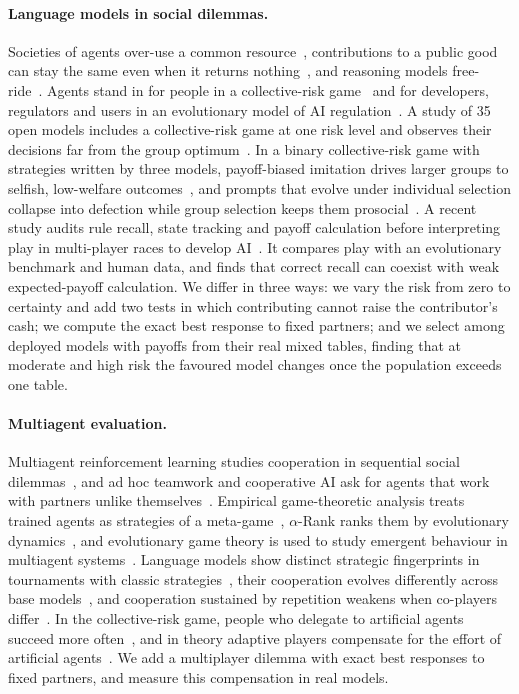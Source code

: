 \documentclass[sigconf,anonymous]{aamas}
\begin{document}
\paragraph{Language models in social dilemmas.}
Societies of agents over-use a common resource~\cite{piatti2024cooperate}, contributions to a public good can stay the same even when it returns nothing~\cite{huang2025competing}, and reasoning models free-ride~\cite{guzmanpiedrahita2025corrupted}. Agents stand in for people in a collective-risk game~\cite{slumbers2025using} and for developers, regulators and users in an evolutionary model of AI regulation~\cite{buscemi2025llms}. A study of 35 open models includes a collective-risk game at one risk level and observes their decisions far from the group optimum~\cite{kumar2026cooperative}. In a binary collective-risk game with strategies written by three models, payoff-biased imitation drives larger groups to selfish, low-welfare outcomes~\cite{willis2026evaluating}, and prompts that evolve under individual selection collapse into defection while group selection keeps them prosocial~\cite{celiktemel2026group}. A recent study audits rule recall, state tracking and payoff calculation before interpreting play in multi-player races to develop AI~\cite{pham2026humans}. It compares play with an evolutionary benchmark and human data, and finds that correct recall can coexist with weak expected-payoff calculation. We differ in three ways: we vary the risk from zero to certainty and add two tests in which contributing  cannot raise the  contributor's cash; we compute the exact best response to fixed partners; and we select among deployed models with payoffs from their real mixed tables, finding that at moderate and high risk the favoured model changes once the population exceeds one table.

\paragraph{Multiagent evaluation.}
Multiagent reinforcement learning studies cooperation in sequential social dilemmas~\cite{leibo2017multi,hughes2018inequity}, and ad hoc teamwork and cooperative AI ask for agents that work with partners unlike themselves~\cite{stone2010ad,dafoe2020open,leibo2021scalable}. Empirical game-theoretic analysis treats trained agents as strategies of a meta-game~\cite{wellman2006methods,tuyls2018generalised}, $\alpha$-Rank ranks them by evolutionary dynamics~\cite{omidshafiei2019alpha}, and evolutionary game theory is used to study emergent behaviour in multiagent systems~\cite{han2022emergent}. Language models show distinct strategic fingerprints in tournaments with classic strategies~\cite{payne2025strategic}, their cooperation evolves differently across base models~\cite{vallinder2025cultural}, and cooperation sustained by repetition weakens when co-players differ~\cite{tewolde2026coopeval}. In the collective-risk game, people who delegate to artificial agents succeed more often~\cite{fernandezdomingos2022delegation}, and in theory adaptive players compensate for the effort of artificial agents~\cite{terrucha2024art}. We add a multiplayer dilemma with exact best responses to fixed partners, and measure this compensation in real models.
\end{document}
